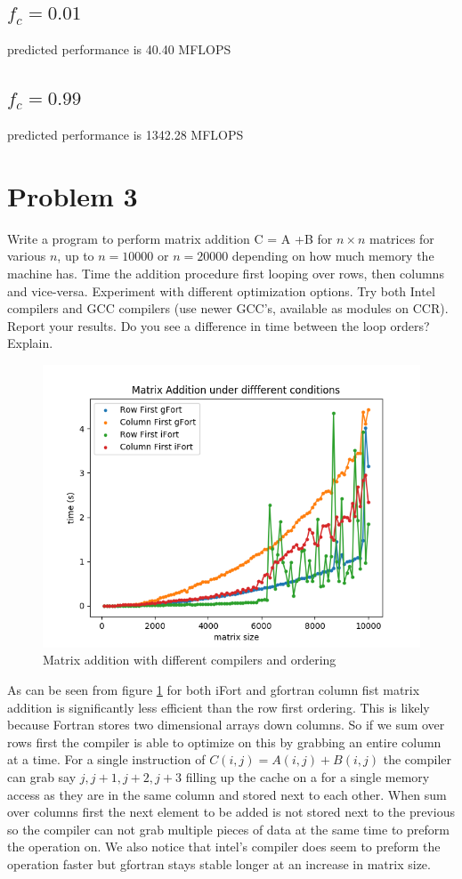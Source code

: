 \documentclass[12pt]{article}
\theoremstyle{plain}
\theoremstyle{definition}
\begin{document}
\subsection{$f_c = 0.01$}
predicted performance is 40.40 MFLOPS
\subsection{$f_c = 0.99$}
predicted performance is 1342.28 MFLOPS

\section*{Problem 3}
Write a program to perform matrix addition C = A +B for $n \times n$ matrices for various $n$,
up to $n = 10000$ or $n = 20000$ depending on how much memory the machine has. Time
the addition procedure first looping over rows, then columns and vice-versa. Experiment
with different optimization options. Try both Intel compilers and GCC compilers (use
newer GCC’s, available as modules on CCR). Report your results. Do you see a difference
in time between the loop orders? Explain.

\begin{figure}
\label{fig:problem3}
\includegraphics[scale=0.7]{problem3.png}
\caption{Matrix addition with different compilers and ordering}
\end{figure}

As can be seen from figure \ref{fig:problem3} for both iFort and gfortran  column fist matrix addition is significantly less efficient than the row first ordering. This is likely because Fortran stores two dimensional arrays down columns. So if we sum over rows first the compiler is able to optimize on this by grabbing an entire column at a time. For a single instruction of $C(i,j) = A(i,j) + B(i,j)$ the compiler can grab say $j,j+1,j+2,j+3$ filling up the cache on a for a single memory access as they are in the same column and stored next to each other. When sum over columns first the next element to be added is not stored next to the previous so the compiler can not grab multiple pieces of data at the same time to preform the operation on. We also notice that intel's compiler does seem to preform the operation faster but gfortran stays stable longer at an increase in matrix size.
\end{document}
